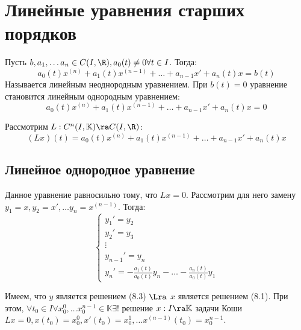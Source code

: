 
\section{Линейные уравнения старших порядков}
\begin{definition}
    Пусть \(b, a_1, \dots a_n \in C(I, \R), a_0(t) \ne 0 \forall t \in I\). Тогда:
    \begin{equation}
        a_0(t)x^{(n)} + a_1(t)x^{(n - 1)} + \dots + a_{n - 1}x' + a_n(t)x = b(t)
    \end{equation}
    Называется линейным неоднородным уравнением. При \(b(t) = 0\) уравнение становится линейным однородным уравнением:
    \begin{equation}
        a_0(t)x^{(n)} + a_1(t)x^{(n - 1)} + \dots + a_{n - 1}x' + a_n(t)x = 0
    \end{equation}
\end{definition}

Рассмотрим \(L: C^n(I, \mathbb{K}) \ra C(I, \R)\):
\[(Lx)(t) = a_0(t)x^{(n)} + a_1(t)x^{(n - 1)} + \dots + a_{n - 1}x' + a_n(t)x\]

\subsection{Линейное однородное уравнение}
Данное уравнение равносильно тому, что \(Lx = 0\). Рассмотрим для него замену \(y_1 = x, y_2 = x', \dots y_n = x^{(n - 1)}\). Тогда:
\begin{equation}
    \begin{cases}
        y_1' = y_2 \\
        y_2' = y_3 \\
        \vdots \\
        y_{n - 1}' = y_n \\
        y_n' = -\frac{a_1(t)}{a_0(t)}y_n - \dots - \frac{a_n(t)}{a_0(t)}y_1
    \end{cases}
\end{equation}

Имеем, что \(y\) является решением (8.3) \(\Lra\) \(x\) является решением (8.1). При этом, \(\forall t_0 \in I \forall x_0^0, \dots x_0^{n - 1} \in \mathbb{K} \exists!\) решение \(x: I \ra \mathbb{K}\) задачи Коши \(Lx = 0, x(t_0) = x_0^0, x'(t_0) = x_0^1, \dots x^{(n - 1)}(t_0) = x_0^{n - 1}\).

